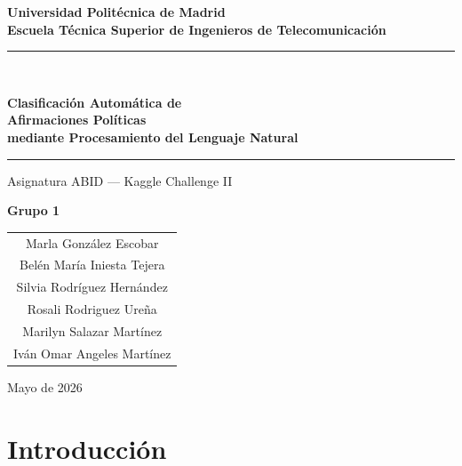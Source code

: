 \documentclass[12pt,a4paper]{article}
\begin{document}
\begin{titlepage}
  \centering
  \vspace*{1cm}
  {\large\bfseries Universidad Politécnica de Madrid\\[0.3em]
  Escuela T\'{e}cnica Superior de Ingenieros de Telecomunicaci\'{o}n\par}
  \vspace{0.9cm}
  \rule{\linewidth}{0.5pt}\\[0.4em]
  {\Large\bfseries Clasificación Automática de\\[0.3em]
  Afirmaciones Políticas\\[0.3em]
  mediante Procesamiento del Lenguaje Natural\par}
  \vspace{0.4em}\rule{\linewidth}{0.5pt}
  \vspace{0.9cm}
  {\large Asignatura ABID --- Kaggle Challenge II\par}
  \vspace{1.2cm}
  {\large\bfseries Grupo 1\par}
  \vspace{0.5cm}
  {\normalsize
  \begin{tabular}{c}
    Marla Gonz\'{a}lez Escobar               \\[0.3em]
    Bel\'{e}n Mar\'{i}a Iniesta Tejera       \\[0.3em]
    Silvia Rodr\'{i}guez Hern\'{a}ndez       \\[0.3em]
    Rosali Rodriguez Ure\~{n}a               \\[0.3em]
    Marilyn Salazar Mart\'{i}nez             \\[0.3em]
    Iv\'{a}n Omar Angeles Mart\'{i}nez       \\
  \end{tabular}\par}
  \vfill
  {\normalsize Mayo de 2026\par}
\end{titlepage}

\tableofcontents
\newpage

\section{Introducción}
\end{document}
